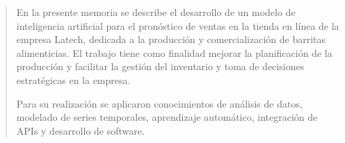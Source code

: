 \documentclass[
    11pt,
    spanish,
    singlespacing,
    parskip,
    headsepline,
    bookmarks=true,
    unicode=true,
    pdftoolbar=true,
    pdfmenubar=true,
    pdffitwindow=false,
    colorlinks=true,
    linkcolor=blue,
    citecolor=blue,
    urlcolor=blue
]{MastersDoctoralThesis}
\def\textbf#1{#1}%
\begin{document}



\frontmatter %
\pagestyle{plain} %


\begin{abstract}
\addchaptertocentry{\abstractname} %
En la presente memoria se describe el desarrollo de un modelo de inteligencia artificial para el pronóstico de ventas en la tienda en línea de la empresa Latech, dedicada a la producción y comercialización de barritas alimenticias. El trabajo tiene como finalidad mejorar la planificación de la producción y facilitar la gestión del inventario y toma de decisiones estratégicas en la empresa.

Para su realización se aplicaron conocimientos de análisis de datos, modelado de series temporales, aprendizaje automático, integración de APIs y desarrollo de software.


\end{abstract}

%

\tableofcontents
\listoffigures
\listoftables


\mainmatter %
\pagestyle{thesis} %
\end{document}
